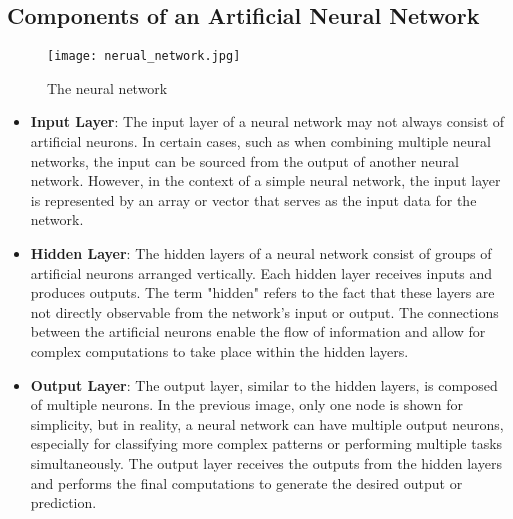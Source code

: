 \subsection{Components of an Artificial Neural Network}
\begin{figure}[H]
  \centering
  \texttt{[image: nerual\_network.jpg]}
  \caption{The neural network}
\end{figure}
\begin{itemize}
\item \textbf{Input Layer}: The input layer of a neural network may not always consist of artificial neurons.
  In certain cases, such as when combining multiple neural networks, the input can be sourced from the output
  of another neural network. However, in the context of a simple neural network, the input layer is represented
  by an array or vector that serves as the input data for the network.
  
\item \textbf{Hidden Layer}: The hidden layers of a neural network consist of groups of artificial neurons
  arranged vertically. Each hidden layer receives inputs and produces outputs. The term "hidden" refers to
  the fact that these layers are not directly observable from the network's input or output. The connections
  between the artificial neurons enable the flow of information and allow for complex computations to take
  place within the hidden layers.
  
\item \textbf{Output Layer}: The output layer, similar to the hidden layers, is composed of multiple neurons.
  In the previous image, only one node is shown for simplicity, but in reality, a neural network can have
  multiple output neurons, especially for classifying more complex patterns or performing multiple tasks
  simultaneously. The output layer receives the outputs from the hidden layers and performs the final
  computations to generate the desired output or prediction.
\end{itemize}
